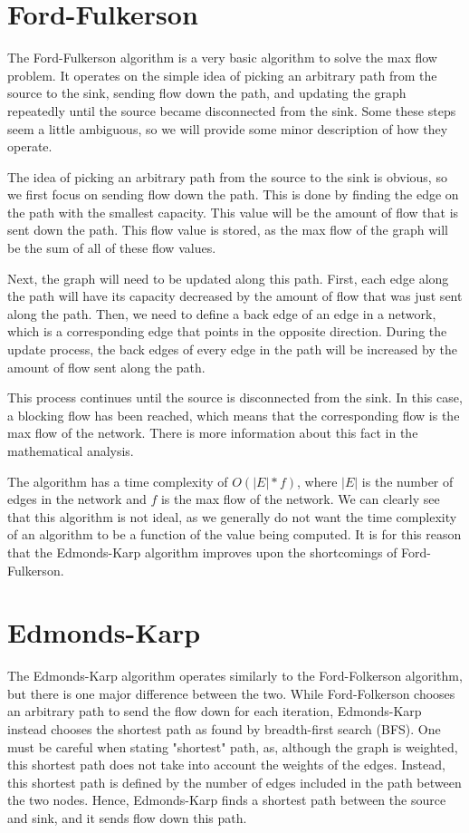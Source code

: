 \documentclass{report}
\begin{document}
\section{Ford-Fulkerson}
The Ford-Fulkerson algorithm is a very basic algorithm to solve the max flow problem. It operates on the simple idea of picking an arbitrary path from the source to the sink, sending flow down the path, and updating the graph repeatedly until the source became disconnected from the sink. Some these steps seem a little ambiguous, so we will provide some minor description of how they operate.

The idea of picking an arbitrary path from the source to the sink is obvious, so we first focus on sending flow down the path. This is done by finding the edge on the path with the smallest capacity. This value will be the amount of flow that is sent down the path. This flow value is stored, as the max flow of the graph will be the sum of all of these flow values.

Next, the graph will need to be updated along this path. First, each edge along the path will have its capacity decreased by the amount of flow that was just sent along the path. Then, we need to define a back edge of an edge in a network, which is a corresponding edge that points in the opposite direction. During the update process, the back edges of every edge in the path will be increased by the amount of flow sent along the path.

This process continues until the source is disconnected from the sink. In this case, a blocking flow has been reached, which means that the corresponding flow is the max flow of the network. There is more information about this fact in the mathematical analysis.

The algorithm has a time complexity of $O(|E|*f)$, where $|E|$ is the number of edges in the network and $f$ is the max flow of the network. We can clearly see that this algorithm is not ideal, as we generally do not want the time complexity of an algorithm to be a function of the value being computed. It is for this reason that the Edmonds-Karp algorithm improves upon the shortcomings of Ford-Fulkerson.

\section{Edmonds-Karp}
The Edmonds-Karp algorithm operates similarly to the Ford-Folkerson algorithm, but there is one major difference between the two. While Ford-Folkerson chooses an arbitrary path to send the flow down for each iteration, Edmonds-Karp instead chooses the shortest path as found by breadth-first search (BFS). One must be careful when stating "shortest" path, as, although the graph is weighted, this shortest path does not take into account the weights of the edges. Instead, this shortest path is defined by the number of edges included in the path between the two nodes. Hence, Edmonds-Karp finds a shortest path between the source and sink, and it sends flow down this path.
\end{document}
